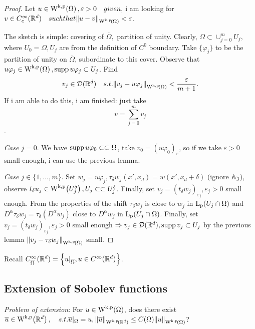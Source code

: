 \documentclass{article}
\begin{document}
\begin{proof}
	Let $u \in \WkpSet{\Omega}, \varepsilon >0 \quad{given},$ i am looking for $v \in C^{\infty}_c(\R^d) \quad{such that} \norm{u-v}_{\WkpSet{\Omega}} < \varepsilon$.

	The sketch is simple: covering of $\overline{\Omega},$ partition of unity.
	Clearly, $\Omega \subset \cup_{j=0}^m U_j,$ where $U_0 = \Omega, U_j$ are from the definition of $C^0$ boundary. Take $\{\varphi_j\}$ to be the partition of unity on $\overline{\Omega}$, subordinate to this cover. Observe that $u \varphi_j \in \WkpSet{\Omega}, \supp u \varphi_j \subset U_j$. Find
	\[
		v_j \in \mathcal{D}(\R^d) \quad{s.t.} \norm{v_j - u \varphi_j}_{\WkpSet{\Omega}}< \frac{\varepsilon}{m+1}.
	\]
	If i am able to do this, i am finished: just take
	\[
		v=\sum_{j=0}^m v_j
	\]
	.

	\textit{Case $j=0$}. We have $ \operatorname{supp} u \varphi_0 \subset \subset \Omega$, take $v_0 = (u \varphi_0)_{\varepsilon}$, so if we take $\varepsilon >0 $ small enough, i can use the previous lemma.

	\textit{Case $j \in \{1,\dots,m\} $}.
	Set $w_j = u \varphi_j, \tau_{\delta}w_j(x', x_d) = w(x', x_d + \delta)$ (ignore $\mathbb{A_j}$), observe $t_{\delta}u_j \in \WkpSet{U^{\delta}_j}, U_j \subset \subset U^{\delta}_j$. Finally, set $v_j = (t_{\delta}w_j)_{\varepsilon_j}, \varepsilon_j >0$ small enough. From the properties of the shift $\tau_{\delta} w_j$ is close to $w_j$ in $\LpSet{U_j \cap \Omega}$ and $D^\alpha \tau_{\delta}w_j = \tau_{\delta}(D^\alpha w_j)$ close to $D^\alpha w_j$ in $\LpSet{U_j \cap \Omega}$. Finally, set $v_j = (t_{\delta} w_j)_{\varepsilon_j}, \varepsilon_j >0 $ small enough $\Rightarrow v_j \in \mathcal{D}({\mathbb R}^d), \operatorname{supp} v_j \subset U_j$ by the previous lemma $ \norm{v_j - \tau_{\delta}w_j}_{\WkpSet{\Omega}}$ small. 

\end{proof}	

\begin{remark}
	Recall $C^\infty_{\overline{\Omega}}({\mathbb R}^d) = \Big\{u|_{\overline{\Omega}}, u \in C^{\infty}({\mathbb R}^d) \Big\}$.
\end{remark}

\subsection{Extension of Sobolev functions}
\label{sec:extension}

\textit{Problem of extension}: For $u \in \WkpSet{\Omega}$, does there exist $\overline{u} \in \WkpSet{\R^d}, \quad{s.t. } \overline{u}|_{\Omega}=u, \norm{\overline{u}}_{\WkpSet{\R^d}} \leq C(\Omega) \norm{u}_{\WkpSet{\Omega}}$?
\end{document}
